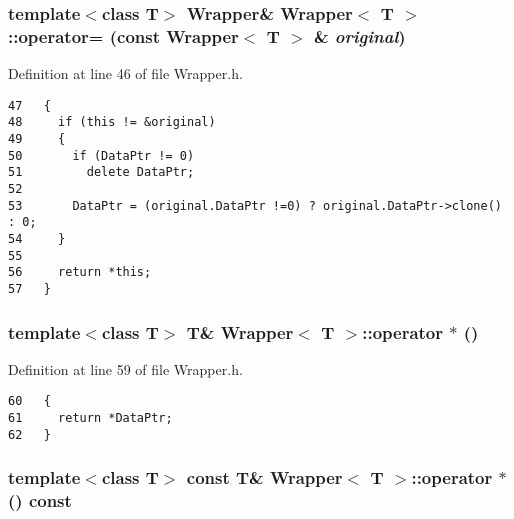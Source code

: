 \subsubsection{\setlength{\rightskip}{0pt plus 5cm}template$<$class T$>$ {\bf Wrapper}\& {\bf Wrapper}$<$ T $>$::operator= (const {\bf Wrapper}$<$ T $>$ \& {\em original})\hspace{0.3cm}{\tt  [inline]}}\label{classWrapper_8c19573051f3bbe811393abb3691147c}




Definition at line 46 of file Wrapper.h.

\begin{Code}\begin{verbatim}47   {
48     if (this != &original)
49     {
50       if (DataPtr != 0)
51         delete DataPtr;
52         
53       DataPtr = (original.DataPtr !=0) ? original.DataPtr->clone() : 0;
54     }
55     
56     return *this;
57   }
\end{verbatim}
\end{Code}


\subsubsection{\setlength{\rightskip}{0pt plus 5cm}template$<$class T$>$ T\& {\bf Wrapper}$<$ T $>$::operator $\ast$ ()\hspace{0.3cm}{\tt  [inline]}}\label{classWrapper_9b083b2466e4e43c516bc8a3e2e47e56}




Definition at line 59 of file Wrapper.h.

\begin{Code}\begin{verbatim}60   {
61     return *DataPtr;
62   }
\end{verbatim}
\end{Code}


\subsubsection{\setlength{\rightskip}{0pt plus 5cm}template$<$class T$>$ const T\& {\bf Wrapper}$<$ T $>$::operator $\ast$ () const\hspace{0.3cm}{\tt  [inline]}}\label{classWrapper_4841ac8c58122f1d8479577616f6617a}




